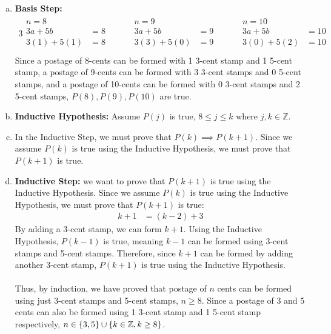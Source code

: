 \documentclass[article, 11pt]{article}
\DeclarePairedDelimiter\set{\{}{\}}
\newcommand{\unite}{\cup}
\newcommand{\ints}{\mathbb{Z}}
\begin{document}
\begin{enumerate}[a)]
    \item 
    \textbf{Basis Step:}
    \begin{alignat*}{3}
        \begin{aligned}
            n = 8 \\
            3a + 5b &= 8 \\
            3(1) + 5(1) &= 8 \\
        \end{aligned} \quad &&
        \begin{aligned}
            n = 9 \\
            3a + 5b &= 9 \\
            3(3) + 5(0) &= 9 \\
        \end{aligned} \quad &&
        \begin{aligned}
            n = 10 \\
            3a + 5b &= 10 \\
            3(0) + 5(2) &= 10 \\
        \end{aligned}
    \end{alignat*}
    Since a postage of 8-cents can be formed with 1 3-cent stamp and 1 5-cent stamp, a postage of 9-cents can be formed with 3 3-cent stamps and 0 5-cent stamps, and a postage of 10-cents can be formed with 0 3-cent stamps and 2 5-cent stamps, $P(8),P(9),P(10)$ are true.
    \item 
    \textbf{Inductive Hypothesis:} Assume $P(j)$ is true, $8 \leq j \leq k$ where $j,k \in \ints$.
    \item 
    In the Inductive Step, we must prove that $P(k) \implies P(k+1)$. Since we assume $P(k)$ is true using the Inductive Hypothesis, we must prove that $P(k+1)$ is true.
    \item 
    \textbf{Inductive Step:} we want to prove that $P(k+1)$ is true using the Inductive Hypothesis. Since we assume $P(k)$ is true using the Inductive Hypothesis, we must prove that $P(k+1)$ is true: 
    \begin{align*}
        k + 1 &= (k - 2) + 3
    \end{align*}
    By adding a 3-cent stamp, we can form $k+1$. Using the Inductive Hypothesis, $P(k-1)$ is true, meaning $k-1$ can be formed using 3-cent stamps and 5-cent stamps. Therefore, since $k+1$ can be formed by adding another 3-cent stamp, $P(k+1)$ is true using the Inductive Hypothesis. \\
    \\
    Thus, by induction, we have proved that postage of $n$ cents can be formed using just 3-cent stamps and 5-cent stamps, $n \geq 8$. Since a postage of 3 and 5 cents can also be formed using 1 3-cent stamp and 1 5-cent stamp respectively, $n \in \set*{3,5} \unite \set*{k \in \ints, k \geq 8}$.
\end{enumerate}
\end{document}
